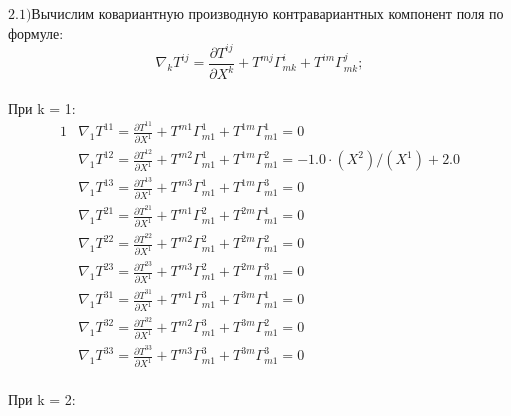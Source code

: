 \documentclass[a4paper, 12pt, oneside]{article}
\begin{document}
$\mathrm{2.1) }$Вычислим ковариантную производную контравариантных компонент поля по формуле:\\
\[
\nabla_kT^{ij} = \frac{\partial T^{ij}}{\partial X^k} + T^{mj}\Gamma^i_{mk} + T^{im}\Gamma^j_{mk};
\]\\
При k = 1:\\
\begin{alignat*}{1}
  & \nabla_1T^{11} = \frac{\partial T^{11}}{\partial X^1} + T^{m1}\Gamma^1_{m1} + T^{1m}\Gamma^1_{m1} = 0 \\
  & \nabla_1T^{12} = \frac{\partial T^{12}}{\partial X^1} + T^{m2}\Gamma^1_{m1} + T^{1m}\Gamma^2_{m1} = -1.0\cdot (X^2)/(X^1) + 2.0 \\
  & \nabla_1T^{13} = \frac{\partial T^{13}}{\partial X^1} + T^{m3}\Gamma^1_{m1} + T^{1m}\Gamma^3_{m1} = 0 \\
  & \nabla_1T^{21} = \frac{\partial T^{21}}{\partial X^1} + T^{m1}\Gamma^2_{m1} + T^{2m}\Gamma^1_{m1} = 0 \\
  & \nabla_1T^{22} = \frac{\partial T^{22}}{\partial X^1} + T^{m2}\Gamma^2_{m1} + T^{2m}\Gamma^2_{m1} = 0 \\
  & \nabla_1T^{23} = \frac{\partial T^{23}}{\partial X^1} + T^{m3}\Gamma^2_{m1} + T^{2m}\Gamma^3_{m1} = 0 \\
  & \nabla_1T^{31} = \frac{\partial T^{31}}{\partial X^1} + T^{m1}\Gamma^3_{m1} + T^{3m}\Gamma^1_{m1} = 0 \\
  & \nabla_1T^{32} = \frac{\partial T^{32}}{\partial X^1} + T^{m2}\Gamma^3_{m1} + T^{3m}\Gamma^2_{m1} = 0 \\
  & \nabla_1T^{33} = \frac{\partial T^{33}}{\partial X^1} + T^{m3}\Gamma^3_{m1} + T^{3m}\Gamma^3_{m1} = 0 
\end{alignat*}\\
При k = 2:\\
\end{document}
